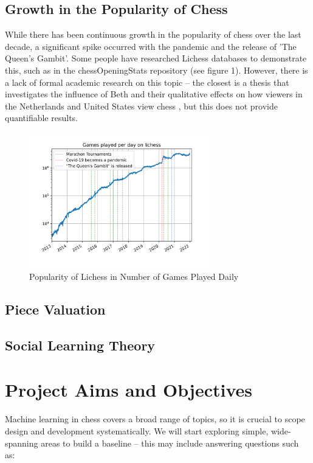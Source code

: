 \documentclass[%
 superscriptaddress,
showpacs,preprintnumbers,
 amsmath,
 amssymb,
 aps,
 pra,
showkeys,
onecolumn,
notitlepage,
11pt,
tightenlines      %
]{revtex4-1}
\begin{document}
\subsection{Growth in the Popularity of Chess}
While there has been continuous growth in the popularity of chess over the last decade, a significant spike occurred with the pandemic and the release of 'The Queen's Gambit'. Some people have researched Lichess databases to demonstrate this, such as in the chessOpeningStats repository (see figure 1). However, there is a lack of formal academic research on this topic -- the closest is a thesis that investigates the influence of Beth and their qualitative effects on how viewers in the Netherlands and United States view chess \cite{lowie2021big}, but this does not provide quantifiable results.

\begin{figure}[h]
    \caption{Popularity of Lichess in Number of Games Played Daily \cite{chessOpeningStats}}
    \begin{center}
    \includegraphics[width=0.7\textwidth]{images/Lichess Number of Games Played Per Day.png}
    \end{center}
\end{figure}

\subsection{Piece Valuation}

\subsection{Social Learning Theory}



\section{Project Aims and Objectives}
Machine learning in chess covers a broad range of topics, so it is crucial to scope design and development systematically. We will start exploring simple, wide-spanning areas to build a baseline -- this may include answering questions such as:
\end{document}
